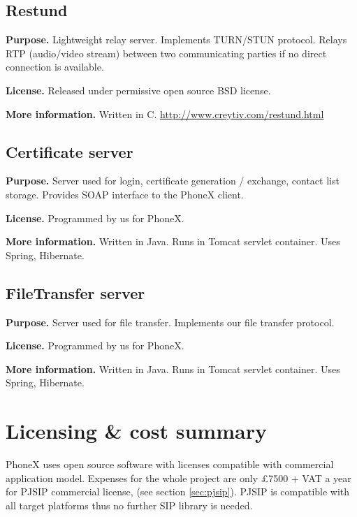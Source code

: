 \documentclass[a4paper,10pt]{article}
\begin{document}
\subsection{Restund}
\par\smallskip\noindent\textbf{Purpose.} Lightweight relay server. Implements TURN/STUN protocol. Relays RTP (audio/video stream) between two 
communicating parties if no direct connection is available.

\par\smallskip\noindent\textbf{License.} Released under permissive open source BSD license.
\par\smallskip\noindent\textbf{More information.}  Written in C. \url{http://www.creytiv.com/restund.html}

\subsection{Certificate server}
\par\smallskip\noindent\textbf{Purpose.} Server used for login, certificate generation / exchange, contact list storage. 
Provides SOAP interface to the PhoneX client.
\par\smallskip\noindent\textbf{License.} Programmed by us for PhoneX.
\par\smallskip\noindent\textbf{More information.}  Written in Java. Runs in Tomcat servlet container. Uses Spring, Hibernate.

\subsection{FileTransfer server}
\par\smallskip\noindent\textbf{Purpose.} Server used for file transfer. Implements our file transfer protocol. 
\par\smallskip\noindent\textbf{License.} Programmed by us for PhoneX.
\par\smallskip\noindent\textbf{More information.}  Written in Java. Runs in Tomcat servlet container. Uses Spring, Hibernate.

\section{Licensing \& cost summary}
PhoneX uses open source software with licenses compatible with commercial application model. Expenses for the whole project 
are only \pounds 7500 + VAT a year for PJSIP commercial license, (see section \ref{sec:pjsip}). PJSIP is compatible with
all target platforms thus no further SIP library is needed.
\end{document}
